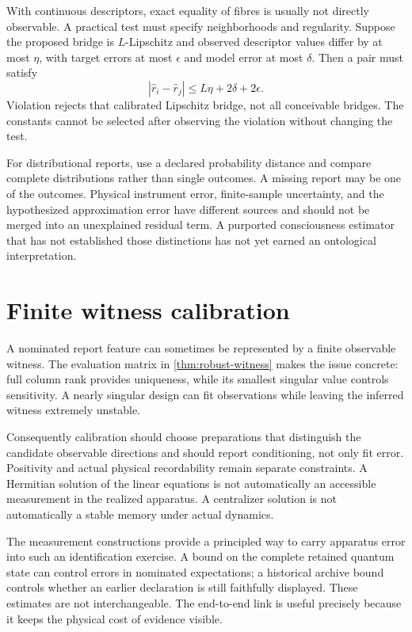 With continuous descriptors, exact equality of fibres is usually not directly observable. A practical test must specify neighborhoods and regularity. Suppose the proposed bridge is $L$-Lipschitz and observed descriptor values differ by at most $\eta$, with target errors at most $\epsilon$ and model error at most $\delta$. Then a pair must satisfy
\[
|\widehat r_i-\widehat r_j|\le L\eta+2\delta+2\epsilon.
\]
Violation rejects that calibrated Lipschitz bridge, not all conceivable bridges. The constants cannot be selected after observing the violation without changing the test.

For distributional reports, use a declared probability distance and compare complete distributions rather than single outcomes. A missing report may be one of the outcomes. Physical instrument error, finite-sample uncertainty, and the hypothesized approximation error have different sources and should not be merged into an unexplained residual term. A purported consciousness estimator that has not established those distinctions has not yet earned an ontological interpretation.

\section{Finite witness calibration}\label{section:evidence:finite-witness-calibration}
A nominated report feature can sometimes be represented by a finite observable witness. The evaluation matrix in \cref{thm:robust-witness} makes the issue concrete: full column rank provides uniqueness, while its smallest singular value controls sensitivity. A nearly singular design can fit observations while leaving the inferred witness extremely unstable.

Consequently calibration should choose preparations that distinguish the candidate observable directions and should report conditioning, not only fit error. Positivity and actual physical recordability remain separate constraints. A Hermitian solution of the linear equations is not automatically an accessible measurement in the realized apparatus. A centralizer solution is not automatically a stable memory under actual dynamics.

The measurement constructions provide a principled way to carry apparatus error into such an identification exercise. A bound on the complete retained quantum state can control errors in nominated expectations; a historical archive bound controls whether an earlier declaration is still faithfully displayed. These estimates are not interchangeable. The end-to-end link is useful precisely because it keeps the physical cost of evidence visible.

